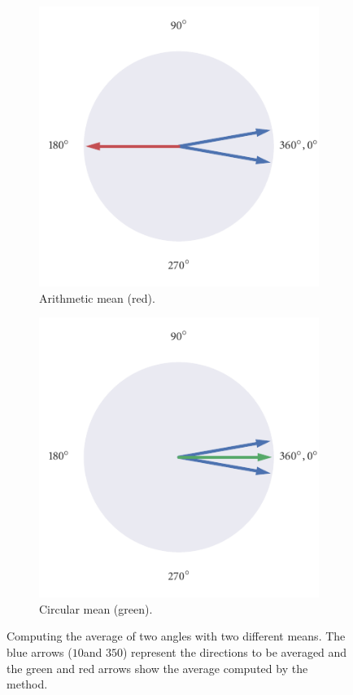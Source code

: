 \begin{figure}
	\begin{subfigure}[b]{0.45\textwidth}
		\includegraphics{arith_mean.pdf}
		\caption{Arithmetic mean (red).}
		\label{subfig:arith_mean}
	\end{subfigure}%
	\hspace{0.05\textwidth}
	\begin{subfigure}[b]{0.45\textwidth}
		\includegraphics{circ_mean.pdf}
		\caption{Circular mean (green).}
		\label{subfig:circ_mean}
	\end{subfigure}
	\caption{Computing the average of two angles with two different means. The blue arrows 
($10$\textdegree and $350$\textdegree) represent the directions to be averaged and the green and red 
arrows show the average computed by the method.}
	\label{fig:visualise_mean}
\end{figure}


